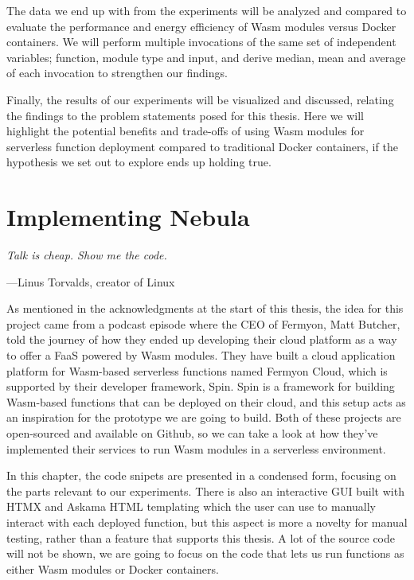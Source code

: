 \documentclass[
  table]{report}
\begin{document}
The data we end up with from the experiments will be analyzed and
compared to evaluate the performance and energy efficiency of \ac{Wasm}
modules versus Docker containers. We will perform multiple invocations
of the same set of independent variables; function, module type and
input, and derive median, mean and average of each invocation to
strengthen our findings.

Finally, the results of our experiments will be visualized and
discussed, relating the findings to the problem statements posed for
this thesis. Here we will highlight the potential benefits and
trade-offs of using \ac{Wasm} modules for serverless function deployment
compared to traditional Docker containers, if the hypothesis we set out
to explore ends up holding true.

\chapter{Implementing Nebula}
\label{chap:implement}

\epigraph{\itshape  
Talk is cheap. Show me the code.
}{---Linus Torvalds, creator of Linux}

As mentioned in the acknowledgments at the start of this thesis, the
idea for this project came from a podcast episode where the CEO of
Fermyon, Matt Butcher, told the journey of how they ended up developing
their cloud platform as a way to offer a \ac{FaaS} powered by \ac{Wasm}
modules. They have built a cloud application platform for
\ac{Wasm}-based serverless functions named Fermyon Cloud, which is
supported by their developer framework, Spin. Spin is a framework for
building \ac{Wasm}-based functions that can be deployed on their cloud,
and this setup acts as an inspiration for the prototype we are going to
build. Both of these projects are open-sourced and available on Github,
so we can take a look at how they've implemented their services to run
\ac{Wasm} modules in a serverless environment.

In this chapter, the code snipets are presented in a condensed form,
focusing on the parts relevant to our experiments. There is also an
interactive GUI built with HTMX and Askama HTML templating which the
user can use to manually interact with each deployed function, but this
aspect is more a novelty for manual testing, rather than a feature that
supports this thesis. A lot of the source code will not be shown, we are
going to focus on the code that lets us run functions as either
\ac{Wasm} modules or Docker containers.
\end{document}
